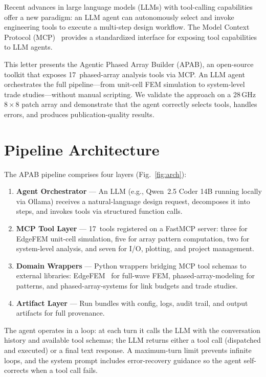 \documentclass[journal]{IEEEtran}
\begin{document}
Recent advances in large language models (LLMs) with tool-calling
capabilities offer a new paradigm: an LLM agent can autonomously select
and invoke engineering tools to execute a multi-step design workflow.
The Model Context Protocol (MCP)~\cite{mcp2024} provides a standardized
interface for exposing tool capabilities to LLM agents.

This letter presents the Agentic Phased Array Builder (APAB), an
open-source toolkit that exposes 17~phased-array analysis tools via MCP.
An LLM agent orchestrates the full pipeline---from unit-cell FEM
simulation to system-level trade studies---without manual scripting.
We validate the approach on a 28\,GHz $8\times8$ patch array and
demonstrate that the agent correctly selects tools, handles errors, and
produces publication-quality results.

\section{Pipeline Architecture}

The APAB pipeline comprises four layers (Fig.~\ref{fig:arch}):

\begin{enumerate}
\item \textbf{Agent Orchestrator} --- An LLM (e.g., Qwen~2.5 Coder
  14B running locally via Ollama) receives a natural-language design
  request, decomposes it into steps, and invokes tools via structured
  function calls.
\item \textbf{MCP Tool Layer} --- 17~tools registered on a FastMCP
  server: three for EdgeFEM unit-cell simulation, five for array pattern
  computation, two for system-level analysis, and seven for I/O,
  plotting, and project management.
\item \textbf{Domain Wrappers} --- Python wrappers bridging MCP tool
  schemas to external libraries: EdgeFEM~\cite{edgefem2026} for
  full-wave FEM, phased-array-modeling for patterns, and
  phased-array-systems for link budgets and trade studies.
\item \textbf{Artifact Layer} --- Run bundles with config, logs, audit
  trail, and output artifacts for full provenance.
\end{enumerate}

The agent operates in a loop: at each turn it calls the LLM with the
conversation history and available tool schemas; the LLM returns either
a tool call (dispatched and executed) or a final text response. A
maximum-turn limit prevents infinite loops, and the system prompt
includes error-recovery guidance so the agent self-corrects when a tool
call fails.
\end{document}
